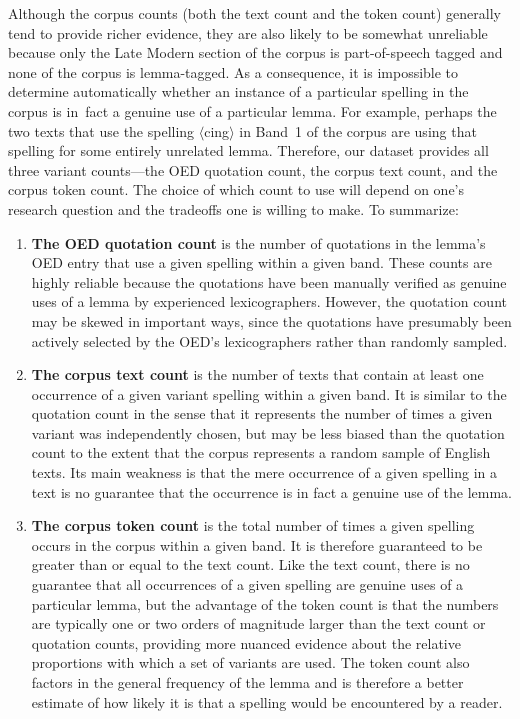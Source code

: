 \documentclass[doc,biblatex]{apa7}
\newcommand\spelling[1]{\allowbreak$\langle$#1$\rangle$}
\begin{document}
Although the corpus counts (both the text count and the token count) generally tend to provide richer evidence, they are also likely to be somewhat unreliable because only the Late Modern section of the corpus is part-of-speech tagged and none of the corpus is lemma-tagged. As a consequence, it is impossible to determine automatically whether an instance of a particular spelling in the corpus is in~fact a genuine use of a particular lemma. For example, perhaps the two texts that use the spelling \spelling{cing} in Band~1 of the corpus are using that spelling for some entirely unrelated lemma. Therefore, our dataset provides all three variant counts---the OED quotation count, the corpus text count, and the corpus token count. The choice of which count to use will depend on one's research question and the tradeoffs one is willing to make. To summarize:
\begin{enumerate}
\item \textbf{The OED quotation count} is the number of quotations in the lemma's OED entry that use a given spelling within a given band. These counts are highly reliable because the quotations have been manually verified as genuine uses of a lemma by experienced lexicographers. However, the quotation count may be skewed in important ways, since the quotations have presumably been actively selected by the OED's lexicographers rather than randomly sampled.
\item \textbf{The corpus text count} is the number of texts that contain at least one occurrence of a given variant spelling within a given band. It is similar to the quotation count in the sense that it represents the number of times a given variant was independently chosen, but may be less biased than the quotation count to the extent that the corpus represents a random sample of English texts. Its main weakness is that the mere occurrence of a given spelling in a text is no guarantee that the occurrence is in fact a genuine use of the lemma.
\item \textbf{The corpus token count} is the total number of times a given spelling occurs in the corpus within a given band. It is therefore guaranteed to be greater than or equal to the text count. Like the text count, there is no guarantee that all occurrences of a given spelling are genuine uses of a particular lemma, but the advantage of the token count is that the numbers are typically one or two orders of magnitude larger than the text count or quotation counts, providing more nuanced evidence about the relative proportions with which a set of variants are used. The token count also factors in the general frequency of the lemma and is therefore a better estimate of how likely it is that a spelling would be encountered by a reader.
\end{enumerate}
\end{document}
